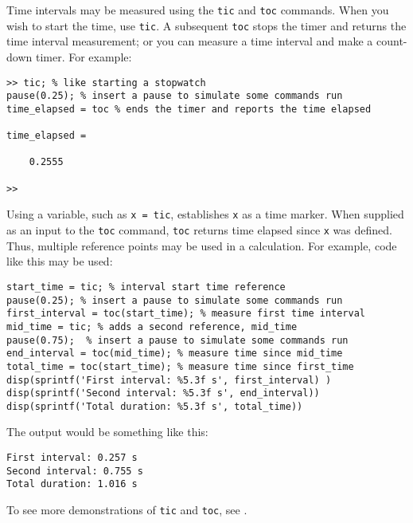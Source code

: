 Time intervals may be measured using the \texttt{tic} and \texttt{toc} commands. When you wish to start the time, use \texttt{tic}. A subsequent \texttt{toc} stops the timer and returns the time interval measurement; or you can measure a time interval and make a count-down timer. For example:
\begin{lstlisting}[style=Matlab-editor]
>> tic; % like starting a stopwatch
pause(0.25); % insert a pause to simulate some commands run
time_elapsed = toc % ends the timer and reports the time elapsed

time_elapsed =

    0.2555

>> 
\end{lstlisting}
Using a variable, such as \texttt{x = tic}, establishes \texttt{x} as a time marker. When supplied as an input to the \texttt{toc} command, \texttt{toc} returns time elapsed since \texttt{x} was defined. Thus, multiple reference points may be used in a calculation. For example, code like this may be used:
\begin{lstlisting}[style=Matlab-editor]
start_time = tic; % interval start time reference
pause(0.25); % insert a pause to simulate some commands run
first_interval = toc(start_time); % measure first time interval
mid_time = tic; % adds a second reference, mid_time
pause(0.75);  % insert a pause to simulate some commands run
end_interval = toc(mid_time); % measure time since mid_time
total_time = toc(start_time); % measure time since first_time
disp(sprintf('First interval: %5.3f s', first_interval) )
disp(sprintf('Second interval: %5.3f s', end_interval))
disp(sprintf('Total duration: %5.3f s', total_time))
\end{lstlisting}
The output would be something like this:
\begin{lstlisting}[style=Matlab-editor]
First interval: 0.257 s
Second interval: 0.755 s
Total duration: 1.016 s
\end{lstlisting}

To see more demonstrations of \texttt{tic} and \texttt{toc}, see .

